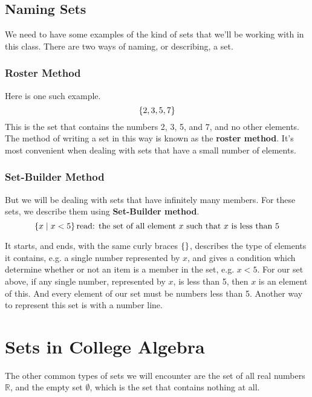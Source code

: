 \subsection{Naming Sets}
We need to have some examples of the kind of sets that we'll be working
with in this class. There are two ways of naming, or describing, a set.

\subsubsection{Roster Method}
Here is one such example.
\[\left\{ 2, 3, 5, 7\right\}\]
This is the set that contains the numbers 2, 3, 5, and 7, and no other
elements. The method of writing a set in this way is known as the
\textbf{roster method}. It's most convenient when dealing with sets 
that have a small number of elements.

\subsubsection{Set-Builder Method}
But we will be dealing with sets that have infinitely many members. For
these sets, we describe them using \textbf{Set-Builder method}.
\[\set{x\mid x\lt 5} \text{read: the set of all element \(x\) such %
    that \(x\) is less than 5}\]

It starts, and ends, with the same curly braces \(\left\{ \right\}\), describes
the type of elements it contains, e.g. a single number represented by
\(x\), and gives a condition which determine whether or not an item is
a member in the set, e.g. \(x\lt 5\). For our set above, if any single
number, represented by \(x\), is less than 5, then \(x\) is an element
of this. And every element of our set must be numbers less than 5.
Another way to represent this set is with a number line.

\begin{center}
\end{center}

\section{Sets in College Algebra}
The other common types of sets we will encounter are the set of all 
real numbers \(\mathbb{R}\), and the empty set \(\emptyset\), which is 
the set that contains nothing at all.